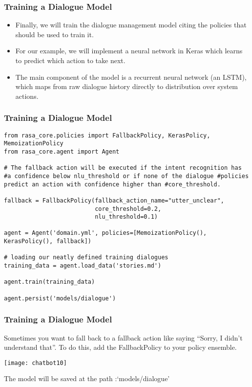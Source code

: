  \begin{frame}[fragile]\frametitle{Training a Dialogue Model}

\begin{itemize}
\item Finally, we will train the dialogue management model citing the policies that should be used to train it. 
\item For our example, we will implement a neural network in Keras which learns to predict which action to take next.
\item The main component of the model is a recurrent neural network (an LSTM), which maps from raw dialogue history directly to distribution over system actions.
\end{itemize}

\end{frame}

 \begin{frame}[fragile]\frametitle{Training a Dialogue Model}

\begin{lstlisting}
from rasa_core.policies import FallbackPolicy, KerasPolicy, MemoizationPolicy
from rasa_core.agent import Agent

# The fallback action will be executed if the intent recognition has #a confidence below nlu_threshold or if none of the dialogue #policies predict an action with confidence higher than #core_threshold.

fallback = FallbackPolicy(fallback_action_name="utter_unclear",
                          core_threshold=0.2,
                          nlu_threshold=0.1)

agent = Agent('domain.yml', policies=[MemoizationPolicy(), KerasPolicy(), fallback])

# loading our neatly defined training dialogues
training_data = agent.load_data('stories.md')

agent.train(training_data)

agent.persist('models/dialogue')
\end{lstlisting}

\end{frame}

 \begin{frame}[fragile]\frametitle{Training a Dialogue Model}

Sometimes you want to fall back to a fallback action like saying “Sorry, I didn’t understand that”. To do this, add the FallbackPolicy to your policy ensemble.

\begin{center}
\texttt{[image: chatbot10]}
\end{center}

The model will be saved at the path :‘models/dialogue’

\end{frame}

